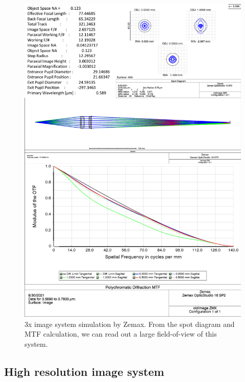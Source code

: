 \begin{figure}[htbp]
\begin{center}
\includegraphics[width = \linewidth]{figures/old image.pdf}
\end{center}
\caption[3x image system simulation by Zemax]{3x image system simulation by Zemax. From the spot diagram and MTF calculation, we can read out a large field-of-view of this system.}
\label{old_image}
\end{figure}

\subsection{High resolution image system}

